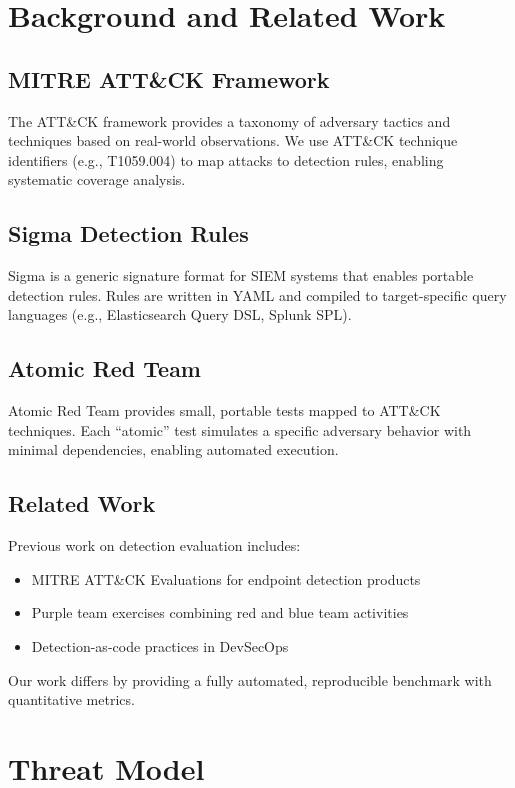 \documentclass[11pt,a4paper]{article}
\begin{document}
\section{Background and Related Work}

\subsection{MITRE ATT\&CK Framework}

The ATT\&CK framework provides a taxonomy of adversary tactics and techniques based on real-world observations. We use ATT\&CK technique identifiers (e.g., T1059.004) to map attacks to detection rules, enabling systematic coverage analysis.

\subsection{Sigma Detection Rules}

Sigma is a generic signature format for SIEM systems that enables portable detection rules. Rules are written in YAML and compiled to target-specific query languages (e.g., Elasticsearch Query DSL, Splunk SPL).

\subsection{Atomic Red Team}

Atomic Red Team provides small, portable tests mapped to ATT\&CK techniques. Each ``atomic'' test simulates a specific adversary behavior with minimal dependencies, enabling automated execution.

\subsection{Related Work}

Previous work on detection evaluation includes:
\begin{itemize}
    \item MITRE ATT\&CK Evaluations for endpoint detection products
    \item Purple team exercises combining red and blue team activities
    \item Detection-as-code practices in DevSecOps
\end{itemize}

Our work differs by providing a fully automated, reproducible benchmark with quantitative metrics.

\section{Threat Model}
\end{document}
